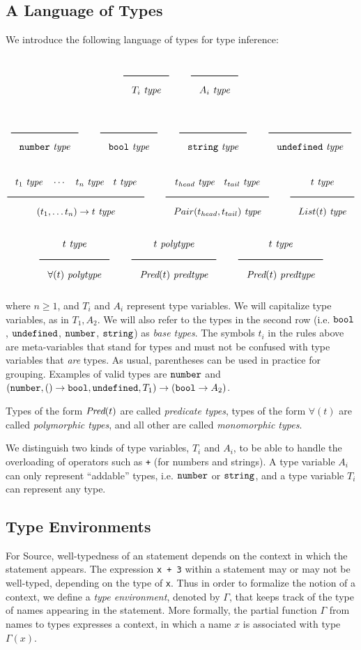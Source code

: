 \subsection{A Language of Types}
\label{simpltyped}

We introduce the following language of types for type inference:

\[
\Rule{}{T_i\ \type}
\qquad
\Rule{}{A_i\ \type}
\]

\[
\Rule{}{\Number\ \type}
\qquad
\Rule{}{\Bool\ \type}
\qquad
\Rule{}{\String\ \type}
\qquad
\Rule{}{\Undefined\ \type}
\]

\[ \Rule{t_1\ \type \quad \cdots\quad t_n\ \type\quad t\ \type}{(t_1, \ldots t_n) \rightarrow t\ \type}
\qquad
\Rule{t_{head}\ \type \quad t_{tail}\ \type}{Pair(t_{head},t_{tail})\ \type}
\qquad
\Rule{t\ \type}{List(t)\ \type}
\]
\[
\Rule{t\ \type}{\forall ( t )\ \polytype}
\qquad
\Rule{t\ \polytype}{\Pred(t)\ \predtype}
\qquad
\Rule{t\ \type}{\Pred(t)\ \predtype}
\]

\noindent
where $n \geq 1$, and $T_i$ and $A_i$ represent type variables. We will capitalize 
type variables, as in $T_1, A_2$. We will also refer to the types in the second row (i.e. $\texttt{bool}$,
$\texttt{undefined}$, $\texttt{number}$, $\texttt{string}$) as \emph{base types}. The symbols $t_i$ in the rules above
are meta-variables that stand for types and must not be confused with type variables
that \emph{are} types.
As usual, parentheses can be used in practice for grouping.
Examples of valid types are $\texttt{number}$ and
$(\texttt{number}, () \rightarrow \texttt{bool}, \texttt{undefined}, T_1) \rightarrow (\texttt{bool} \rightarrow A_2)$.

Types of the form $\textit{Pred} ( t )$ are called \emph{predicate types},
types of the form $\forall ( t )$ are called \emph{polymorphic types},
and all other are called \emph{monomorphic types}.

We distinguish two kinds of type variables, $T_i$ and $A_i$, to be able to handle
the overloading of operators such as \texttt{+} (for numbers and strings).
A type variable $A_i$ can only
represent ``addable'' types, i.e. 
$\texttt{number}$ or $\texttt{string}$, and
a type variable $T_i$ can represent any type.

\subsection{Type Environments}

For Source, well-typedness of an statement depends on the context in which the
statement appears. The expression \verb#x + 3# within a statement may or may 
not be well-typed, depending on the type of \verb#x#. Thus in order 
to formalize the notion of a context, we define a 
\emph{type environment}, denoted by $\Gamma$, that keeps track
of the type of names appearing in the statement. More
formally,
the partial function $\Gamma$ from names to types expresses a 
context, in which a name $x$ is associated with type $\Gamma(x)$. 

